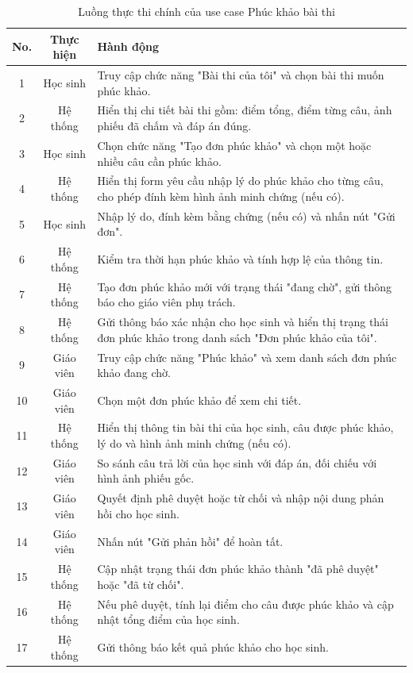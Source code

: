 ﻿\documentclass[../DoAn.tex]{subfiles}
\begin{document}
\begin{table}[H]
\centering
\begin{tabular}{|c|c|p{9cm}|}
\hline
\textbf{No.} & \textbf{Thực hiện} & \textbf{Hành động} \\ \hline
1 & Học sinh & Truy cập chức năng "Bài thi của tôi" và chọn bài thi muốn phúc khảo. \\ \hline
2 & Hệ thống & Hiển thị chi tiết bài thi gồm: điểm tổng, điểm từng câu, ảnh phiếu đã chấm và đáp án đúng. \\ \hline
3 & Học sinh & Chọn chức năng "Tạo đơn phúc khảo" và chọn một hoặc nhiều câu cần phúc khảo. \\ \hline
4 & Hệ thống & Hiển thị form yêu cầu nhập lý do phúc khảo cho từng câu, cho phép đính kèm hình ảnh minh chứng (nếu có). \\ \hline
5 & Học sinh & Nhập lý do, đính kèm bằng chứng (nếu có) và nhấn nút "Gửi đơn". \\ \hline
6 & Hệ thống & Kiểm tra thời hạn phúc khảo và tính hợp lệ của thông tin. \\ \hline
7 & Hệ thống & Tạo đơn phúc khảo mới với trạng thái "đang chờ", gửi thông báo cho giáo viên phụ trách. \\ \hline
8 & Hệ thống & Gửi thông báo xác nhận cho học sinh và hiển thị trạng thái đơn phúc khảo trong danh sách "Đơn phúc khảo của tôi". \\ \hline
9 & Giáo viên & Truy cập chức năng "Phúc khảo" và xem danh sách đơn phúc khảo đang chờ. \\ \hline
10 & Giáo viên & Chọn một đơn phúc khảo để xem chi tiết. \\ \hline
11 & Hệ thống & Hiển thị thông tin bài thi của học sinh, câu được phúc khảo, lý do và hình ảnh minh chứng (nếu có). \\ \hline
12 & Giáo viên & So sánh câu trả lời của học sinh với đáp án, đối chiếu với hình ảnh phiếu gốc. \\ \hline
13 & Giáo viên & Quyết định phê duyệt hoặc từ chối và nhập nội dung phản hồi cho học sinh. \\ \hline
14 & Giáo viên & Nhấn nút "Gửi phản hồi" để hoàn tất. \\ \hline
15 & Hệ thống & Cập nhật trạng thái đơn phúc khảo thành "đã phê duyệt" hoặc "đã từ chối". \\ \hline
16 & Hệ thống & Nếu phê duyệt, tính lại điểm cho câu được phúc khảo và cập nhật tổng điểm của học sinh. \\ \hline
17 & Hệ thống & Gửi thông báo kết quả phúc khảo cho học sinh. \\ \hline
\end{tabular}
\caption{Luồng thực thi chính của use case Phúc khảo bài thi}
\label{table:2.3.5_main}
\end{table}
\end{document}
